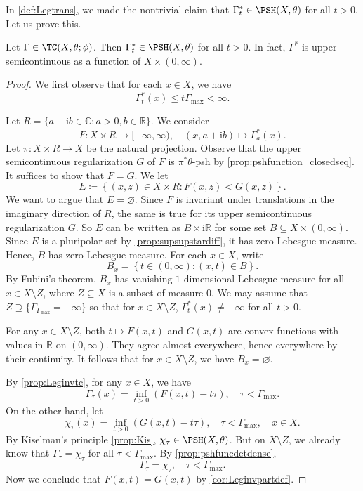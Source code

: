 In \cref{def:Legtrans}, we made the nontrivial claim that $\Gamma^*_t\in \PSH(X,\theta)$ for all $t>0$. Let us prove this.
\begin{lemma}\label{lma:testcurvelegusc}
    Let $\Gamma\in \TC(X,\theta;\phi)$. Then $\Gamma^*_t\in \PSH(X,\theta)$ for all $t>0$. In fact, $\Gamma^*$ is upper semicontinuous as a function of $X\times (0,\infty)$.
\end{lemma}
\begin{proof}
    We first observe that for each $x\in X$, we have
    \[
        \Gamma_t^*(x)\leq t\Gamma_{\max}<\infty.
    \]

    Let $R=\{a+\mathrm{i}b\in \mathbb{C}:a>0,b\in \mathbb{R}\}$. We consider
    \[
        F\colon X\times R\rightarrow [-\infty,\infty),\quad (x,a+\mathrm{i}b)\mapsto \Gamma_a^*(x).
    \]
    Let $\pi\colon X\times R\rightarrow X$ be the natural projection.
    Observe that the upper semicontinuous regularization $G$ of $F$ is $\pi^*\theta$-psh by \cref{prop:pshfunction_closedseq}.
    It suffices to show that $F=G$.
    We let
    \[
        E\coloneqq \left\{ (x,z)\in X\times R: F(x,z)<G(x,z)  \right\}.
    \]
    We want to argue that $E=\varnothing$. Since $F$ is invariant under translations in the imaginary direction of $R$, the same is true for its upper semicontinuous regularization $G$. So $E$ can be written as $B\times \mathrm{i}\mathbb{R}$ for some set $B\subseteq X\times (0,\infty)$. Since $E$ is a pluripolar set by \cref{prop:supsupstardiff}, it has zero Lebesgue measure. Hence, $B$ has zero Lebesgue measure. For each $x\in X$, write
    \[
        B_x=\left\{t\in (0,\infty): (x,t)\in B \right\}.
    \]
    By Fubini's theorem, $B_x$ has vanishing $1$-dimensional Lebesgue measure for all $x\in X\setminus Z$, where $Z\subseteq X$ is a subset of measure $0$. We may assume that $Z\supseteq \{\Gamma_{\Gamma_{\max}}=-\infty\}$ so that for $x\in X\setminus Z$, $\Gamma^*_t(x)\neq -\infty$ for all $t>0$.

    For any $x\in X\setminus Z$, both $t\mapsto F(x,t)$ and $G(x,t)$ are convex functions with values in $\mathbb{R}$ on $(0,\infty)$. They agree almost everywhere, hence everywhere by their continuity. It follows that for $x\in X\setminus Z$, we have $B_x=\varnothing$.

    By \cref{prop:Leginvtc}, for any $x\in X$, we have
    \[
        \Gamma_{\tau}(x)=\inf_{t>0} (F(x,t)-t\tau),\quad \tau<\Gamma_{\max}.
    \]
    On the other hand, let
    \begin{equation}\label{eq:chiGlegtemp1}
        \chi_{\tau}(x)=\inf_{t>0} (G(x,t)-t\tau),\quad \tau<  \Gamma_{\max},\quad x\in X.
    \end{equation}
    By Kiselman's principle \cref{prop:Kis}, $\chi_{\tau}\in \PSH(X,\theta)$. But on $X\setminus Z$, we already know that $\Gamma_{\tau}=\chi_{\tau}$ for all $\tau<\Gamma_{\max}$. By \cref{prop:pshfuncdetdense},
    \[
    \Gamma_{\tau}=\chi_{\tau},\quad \tau<\Gamma_{\max}.
    \]
    Now we conclude that $F(x,t)=G(x,t)$ by \cref{cor:Leginvpartdef}.
\end{proof}

